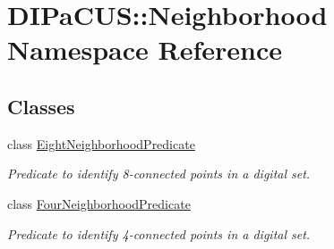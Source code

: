 \hypertarget{namespaceDIPaCUS_1_1Neighborhood}{}\section{D\+I\+Pa\+C\+US\+:\+:Neighborhood Namespace Reference}
\label{namespaceDIPaCUS_1_1Neighborhood}
\subsection*{Classes}
\begin{DoxyCompactItemize}
\item 
class \hyperlink{classDIPaCUS_1_1Neighborhood_1_1EightNeighborhoodPredicate}{Eight\+Neighborhood\+Predicate}
\begin{DoxyCompactList}\small\item\em Predicate to identify 8-\/connected points in a digital set. \end{DoxyCompactList}\item 
class \hyperlink{classDIPaCUS_1_1Neighborhood_1_1FourNeighborhoodPredicate}{Four\+Neighborhood\+Predicate}
\begin{DoxyCompactList}\small\item\em Predicate to identify 4-\/connected points in a digital set. \end{DoxyCompactList}\end{DoxyCompactItemize}
